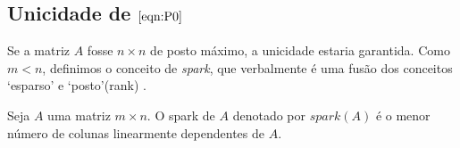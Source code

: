 






\subsection{Unicidade de $\eqref{eqn:P0}$}
Se a matriz $A$ fosse $n \times n$ de posto máximo, a unicidade estaria garantida. Como $m < n$, definimos o conceito de \textit{spark}, que verbalmente é uma fusão dos conceitos `esparso' e `posto'(rank) \cite{kutyniok}.

\begin{definicao}
Seja $A$ uma matriz $m \times n$. O spark de $A$ denotado por $\textit{spark}(A)$ é o menor número de colunas linearmente dependentes de $A$.
\end{definicao}


